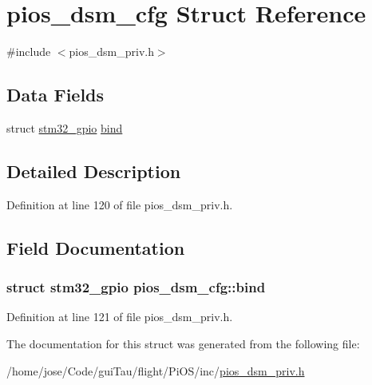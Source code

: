 \hypertarget{structpios__dsm__cfg}{\section{pios\-\_\-dsm\-\_\-cfg Struct Reference}
\label{structpios__dsm__cfg}
}


{\ttfamily \#include $<$pios\-\_\-dsm\-\_\-priv.\-h$>$}

\subsection*{Data Fields}
\begin{DoxyCompactItemize}
\item 
struct \hyperlink{structstm32__gpio}{stm32\-\_\-gpio} \hyperlink{structpios__dsm__cfg_aa476519b30ef3d42a0abba5ce8498805}{bind}
\end{DoxyCompactItemize}


\subsection{Detailed Description}


Definition at line 120 of file pios\-\_\-dsm\-\_\-priv.\-h.



\subsection{Field Documentation}
\hypertarget{structpios__dsm__cfg_aa476519b30ef3d42a0abba5ce8498805}{
\subsubsection[{bind}]{\setlength{\rightskip}{0pt plus 5cm}struct {\bf stm32\-\_\-gpio} pios\-\_\-dsm\-\_\-cfg\-::bind}}\label{structpios__dsm__cfg_aa476519b30ef3d42a0abba5ce8498805}


Definition at line 121 of file pios\-\_\-dsm\-\_\-priv.\-h.



The documentation for this struct was generated from the following file\-:\begin{DoxyCompactItemize}
\item 
/home/jose/\-Code/gui\-Tau/flight/\-Pi\-O\-S/inc/\hyperlink{pios__dsm__priv_8h}{pios\-\_\-dsm\-\_\-priv.\-h}\end{DoxyCompactItemize}
